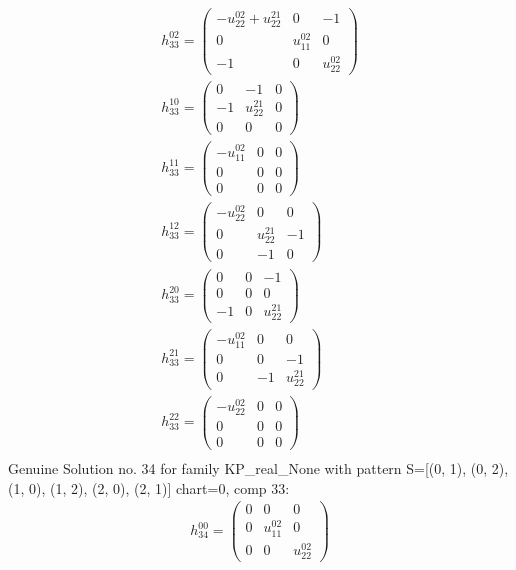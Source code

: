 \documentclass[a4paper, 11pt, twoside, onecolumn]{article}
\begin{document}
\begin{landscape}
\begin{gather*}
	 h_{33}^{02}=\begin{pmatrix}- u^{02}_{22} + u^{21}_{22} & 0 & -1\\0 & u^{02}_{11} & 0\\-1 & 0 & u^{02}_{22}\end{pmatrix}\\ 
	 h_{33}^{10}=\begin{pmatrix}0 & -1 & 0\\-1 & u^{21}_{22} & 0\\0 & 0 & 0\end{pmatrix}\\ 
	 h_{33}^{11}=\begin{pmatrix}- u^{02}_{11} & 0 & 0\\0 & 0 & 0\\0 & 0 & 0\end{pmatrix}\\ 
	 h_{33}^{12}=\begin{pmatrix}- u^{02}_{22} & 0 & 0\\0 & u^{21}_{22} & -1\\0 & -1 & 0\end{pmatrix}\\ 
	 h_{33}^{20}=\begin{pmatrix}0 & 0 & -1\\0 & 0 & 0\\-1 & 0 & u^{21}_{22}\end{pmatrix}\\ 
	 h_{33}^{21}=\begin{pmatrix}- u^{02}_{11} & 0 & 0\\0 & 0 & -1\\0 & -1 & u^{21}_{22}\end{pmatrix}\\ 
	 h_{33}^{22}=\begin{pmatrix}- u^{02}_{22} & 0 & 0\\0 & 0 & 0\\0 & 0 & 0\end{pmatrix}\\ 
\end{gather*} 
Genuine Solution no. 34 for family KP_real_None with pattern S=[(0, 1), (0, 2), (1, 0), (1, 2), (2, 0), (2, 1)] chart=0, comp 33: 
\begin{gather*} 
	 h_{34}^{00}=\begin{pmatrix}0 & 0 & 0\\0 & u^{02}_{11} & 0\\0 & 0 & u^{02}_{22}\end{pmatrix}\\ 

\end{gather*}
\end{landscape}
\end{document}
